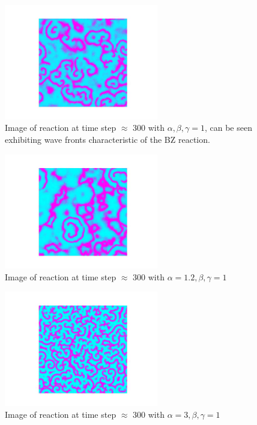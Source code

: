 \documentclass[12pt, A4]{article}
\begin{document}
\begin{figure}[b]
  \begin{center}
    \includegraphics[width=0.6\textwidth]{frame_300.png}
  \end{center}
  \caption{Image of reaction at time step $\approx$ 300 with $\alpha,\beta,\gamma =1$, can be seen exhibiting wave fronts characteristic of the BZ reaction.}
  \label{fig:frame300}
\end{figure}

\begin{figure}[b]
  \begin{center}
    \includegraphics[width=0.6\textwidth]{frame_300_12.png}
  \end{center}
  \caption{Image of reaction at time step $\approx$ 300 with $\alpha=1.2 ,\beta,\gamma =1$}
  \label{fig:frame300_12}
\end{figure}

\begin{figure}[b]
  \begin{center}
    \includegraphics[width=0.6\textwidth]{frame_300_311.png}
  \end{center}
  \caption{Image of reaction at time step $\approx$ 300 with $\alpha=3 ,\beta,\gamma =1$}
  \label{fig:frame_300_311}
\end{figure}
\end{document}
